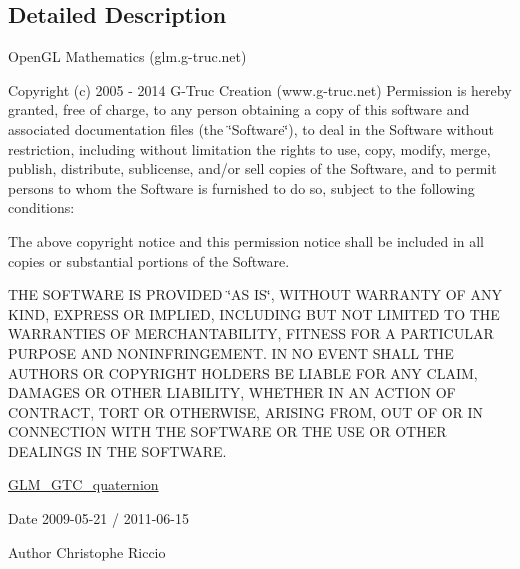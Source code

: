 \subsection{Detailed Description}
Open\-G\-L Mathematics (glm.\-g-\/truc.\-net)

Copyright (c) 2005 -\/ 2014 G-\/\-Truc Creation (www.\-g-\/truc.\-net) Permission is hereby granted, free of charge, to any person obtaining a copy of this software and associated documentation files (the \char`\"{}\-Software\char`\"{}), to deal in the Software without restriction, including without limitation the rights to use, copy, modify, merge, publish, distribute, sublicense, and/or sell copies of the Software, and to permit persons to whom the Software is furnished to do so, subject to the following conditions\-:

The above copyright notice and this permission notice shall be included in all copies or substantial portions of the Software.

T\-H\-E S\-O\-F\-T\-W\-A\-R\-E I\-S P\-R\-O\-V\-I\-D\-E\-D \char`\"{}\-A\-S I\-S\char`\"{}, W\-I\-T\-H\-O\-U\-T W\-A\-R\-R\-A\-N\-T\-Y O\-F A\-N\-Y K\-I\-N\-D, E\-X\-P\-R\-E\-S\-S O\-R I\-M\-P\-L\-I\-E\-D, I\-N\-C\-L\-U\-D\-I\-N\-G B\-U\-T N\-O\-T L\-I\-M\-I\-T\-E\-D T\-O T\-H\-E W\-A\-R\-R\-A\-N\-T\-I\-E\-S O\-F M\-E\-R\-C\-H\-A\-N\-T\-A\-B\-I\-L\-I\-T\-Y, F\-I\-T\-N\-E\-S\-S F\-O\-R A P\-A\-R\-T\-I\-C\-U\-L\-A\-R P\-U\-R\-P\-O\-S\-E A\-N\-D N\-O\-N\-I\-N\-F\-R\-I\-N\-G\-E\-M\-E\-N\-T. I\-N N\-O E\-V\-E\-N\-T S\-H\-A\-L\-L T\-H\-E A\-U\-T\-H\-O\-R\-S O\-R C\-O\-P\-Y\-R\-I\-G\-H\-T H\-O\-L\-D\-E\-R\-S B\-E L\-I\-A\-B\-L\-E F\-O\-R A\-N\-Y C\-L\-A\-I\-M, D\-A\-M\-A\-G\-E\-S O\-R O\-T\-H\-E\-R L\-I\-A\-B\-I\-L\-I\-T\-Y, W\-H\-E\-T\-H\-E\-R I\-N A\-N A\-C\-T\-I\-O\-N O\-F C\-O\-N\-T\-R\-A\-C\-T, T\-O\-R\-T O\-R O\-T\-H\-E\-R\-W\-I\-S\-E, A\-R\-I\-S\-I\-N\-G F\-R\-O\-M, O\-U\-T O\-F O\-R I\-N C\-O\-N\-N\-E\-C\-T\-I\-O\-N W\-I\-T\-H T\-H\-E S\-O\-F\-T\-W\-A\-R\-E O\-R T\-H\-E U\-S\-E O\-R O\-T\-H\-E\-R D\-E\-A\-L\-I\-N\-G\-S I\-N T\-H\-E S\-O\-F\-T\-W\-A\-R\-E.

\hyperlink{group__gtc__quaternion}{G\-L\-M\-\_\-\-G\-T\-C\-\_\-quaternion}

\begin{DoxyDate}{Date}
2009-\/05-\/21 / 2011-\/06-\/15 
\end{DoxyDate}
\begin{DoxyAuthor}{Author}
Christophe Riccio 
\end{DoxyAuthor}
